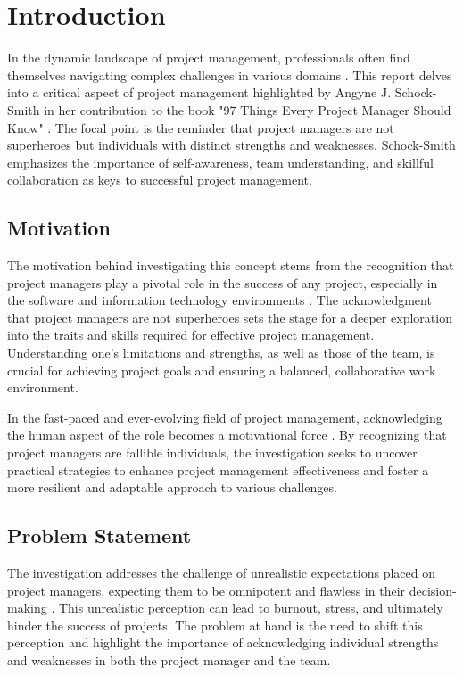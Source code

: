 \documentclass[11pt]{article}
\begin{document}
\section{Introduction}
In the dynamic landscape of project management, professionals often find themselves navigating complex challenges in various domains \cite{Williams2011}. This report delves into a critical aspect of project management highlighted by Angyne J. Schock-Smith in her contribution to the book "97 Things Every Project Manager Should Know" \cite{SchockSmith2017}. The focal point is the reminder that project managers are not superheroes but individuals with distinct strengths and weaknesses. Schock-Smith emphasizes the importance of self-awareness, team understanding, and skillful collaboration as keys to successful project management.

\subsection{Motivation}
The motivation behind investigating this concept stems from the recognition that project managers play a pivotal role in the success of any project, especially in the software and information technology environments \cite{Levitt2011}. The acknowledgment that project managers are not superheroes sets the stage for a deeper exploration into the traits and skills required for effective project management. Understanding one's limitations and strengths, as well as those of the team, is crucial for achieving project goals and ensuring a balanced, collaborative work environment.

In the fast-paced and ever-evolving field of project management, acknowledging the human aspect of the role becomes a motivational force \cite{Horine2009}. By recognizing that project managers are fallible individuals, the investigation seeks to uncover practical strategies to enhance project management effectiveness and foster a more resilient and adaptable approach to various challenges.

\subsection{Problem Statement}
The investigation addresses the challenge of unrealistic expectations placed on project managers, expecting them to be omnipotent and flawless in their decision-making \cite{Pollack2007}. This unrealistic perception can lead to burnout, stress, and ultimately hinder the success of projects. The problem at hand is the need to shift this perception and highlight the importance of acknowledging individual strengths and weaknesses in both the project manager and the team.
\end{document}
